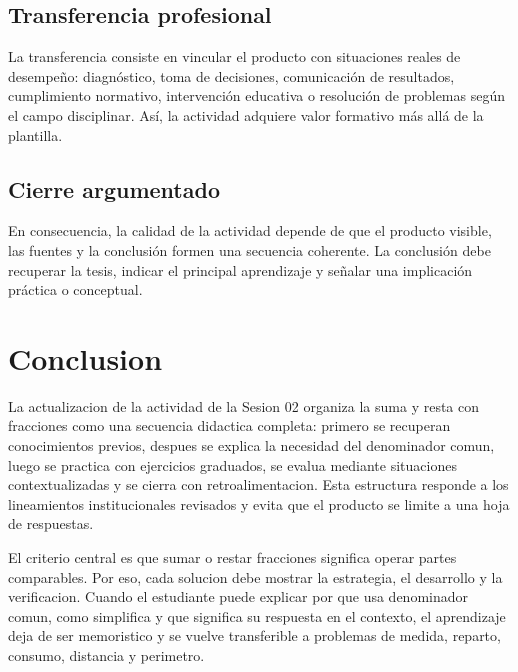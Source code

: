 \documentclass[
	spanish,
	letterpaper, oneside
]{article}
\begin{document}
\subsection*{Transferencia profesional}
La transferencia consiste en vincular el producto con situaciones reales de desempeño: diagnóstico, toma de decisiones, comunicación de resultados, cumplimiento normativo, intervención educativa o resolución de problemas según el campo disciplinar. Así, la actividad adquiere valor formativo más allá de la plantilla.

\subsection*{Cierre argumentado}
En consecuencia, la calidad de la actividad depende de que el producto visible, las fuentes y la conclusión formen una secuencia coherente. La conclusión debe recuperar la tesis, indicar el principal aprendizaje y señalar una implicación práctica o conceptual.


\section{Conclusion}

La actualizacion de la actividad de la Sesion 02 organiza la suma y resta con fracciones como una secuencia didactica completa: primero se recuperan conocimientos previos, despues se explica la necesidad del denominador comun, luego se practica con ejercicios graduados, se evalua mediante situaciones contextualizadas y se cierra con retroalimentacion. Esta estructura responde a los lineamientos institucionales revisados y evita que el producto se limite a una hoja de respuestas.

El criterio central es que sumar o restar fracciones significa operar partes comparables. Por eso, cada solucion debe mostrar la estrategia, el desarrollo y la verificacion. Cuando el estudiante puede explicar por que usa denominador comun, como simplifica y que significa su respuesta en el contexto, el aprendizaje deja de ser memoristico y se vuelve transferible a problemas de medida, reparto, consumo, distancia y perimetro.
\end{document}
